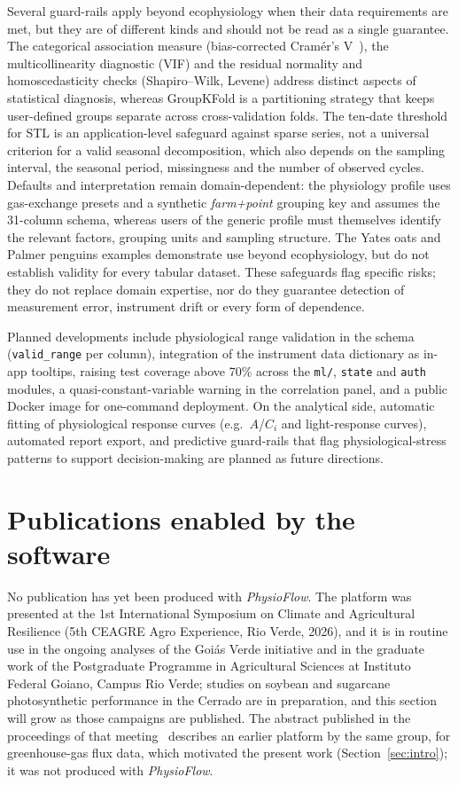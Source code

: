 \documentclass[11pt, letterpaper]{article}
\begin{document}
Several guard-rails apply beyond ecophysiology when their data requirements are met, but they are of different kinds and should not be read as a single guarantee. The categorical association measure (bias-corrected Cram\'er's V~\cite{Bergsma2013}), the multicollinearity diagnostic (VIF) and the residual normality and homoscedasticity checks (Shapiro--Wilk, Levene) address distinct aspects of statistical diagnosis, whereas GroupKFold is a partitioning strategy that keeps user-defined groups separate across cross-validation folds. The ten-date threshold for STL is an application-level safeguard against sparse series, not a universal criterion for a valid seasonal decomposition, which also depends on the sampling interval, the seasonal period, missingness and the number of observed cycles. Defaults and interpretation remain domain-dependent: the physiology profile uses gas-exchange presets and a synthetic \emph{farm+point} grouping key and assumes the 31-column schema, whereas users of the generic profile must themselves identify the relevant factors, grouping units and sampling structure. The Yates oats and Palmer penguins examples demonstrate use beyond ecophysiology, but do not establish validity for every tabular dataset. These safeguards flag specific risks; they do not replace domain expertise, nor do they guarantee detection of measurement error, instrument drift or every form of dependence.

Planned developments include physiological range validation in the schema (\texttt{valid\_range} per column), integration of the instrument data dictionary as in-app tooltips, raising test coverage above 70\% across the \texttt{ml/}, \texttt{state} and \texttt{auth} modules, a quasi-constant-variable warning in the correlation panel, and a public Docker image for one-command deployment. On the analytical side, automatic fitting of physiological response curves (e.g.\ $A$/$C_i$ and light-response curves), automated report export, and predictive guard-rails that flag physiological-stress patterns to support decision-making are planned as future directions.

\section{Publications enabled by the software}\label{sec:enabled}

No publication has yet been produced with \emph{PhysioFlow}. The platform was presented at the 1st International Symposium on Climate and Agricultural Resilience (5th CEAGRE Agro Experience, Rio Verde, 2026), and it is in routine use in the ongoing analyses of the Goi\'as Verde initiative and in the graduate work of the Postgraduate Programme in Agricultural Sciences at Instituto Federal Goiano, Campus Rio Verde; studies on soybean and sugarcane photosynthetic performance in the Cerrado are in preparation, and this section will grow as those campaigns are published. The abstract published in the proceedings of that meeting~\cite{DaSilva2026Goias} describes an earlier platform by the same group, for greenhouse-gas flux data, which motivated the present work (Section~\ref{sec:intro}); it was not produced with \emph{PhysioFlow}.
\end{document}
